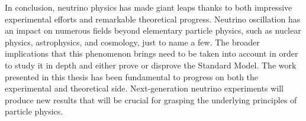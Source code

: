 In conclusion, neutrino physics has made giant leaps thanks to both impressive experimental efforts %
and remarkable theoretical progress.
Neutrino oscillation has an impact on numerous fields beyond elementary particle physics, %
such as nuclear physics, astrophysics, and cosmology, just to name a few.
The broader implications that this phenomenon brings %
need to be taken into account in order to study it in depth and either prove or disprove the Standard Model.
The work presented in this thesis has been fundamental to progress on both the experimental and theoretical side.
Next-generation neutrino experiments will produce new results that will be crucial for grasping the underlying %
principles of particle physics.
